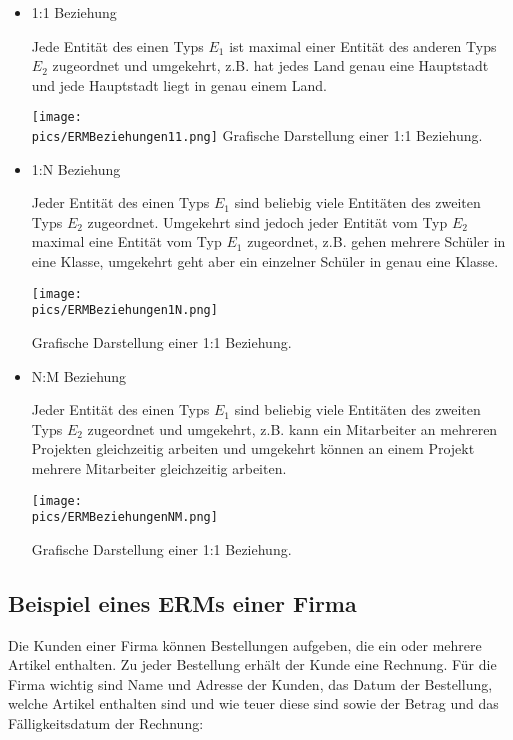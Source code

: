 \begin{itemize}
	\item 1:1 Beziehung

	Jede Entität des einen Typs \(E_1\) ist maximal einer Entität des anderen Typs \(E_2\) zugeordnet und umgekehrt, z.B. hat jedes Land genau eine Hauptstadt und jede Hauptstadt liegt in genau einem Land.
	\begin{minipage}{0.8\textwidth}
		\centering\texttt{[image: \\pics/ERMBeziehungen11.png]}
		Grafische Darstellung einer 1:1 Beziehung.
	\end{minipage}
	\item 1:N Beziehung

	Jeder Entität des einen Typs \(E_1\) sind beliebig viele Entitäten des zweiten Typs \(E_2\) zugeordnet. Umgekehrt sind jedoch jeder Entität vom Typ \(E_2\) maximal eine Entität vom Typ \(E_1\) zugeordnet, z.B. gehen mehrere Schüler in eine Klasse, umgekehrt geht aber ein einzelner Schüler in genau eine Klasse.

	\begin{minipage}{0.8\textwidth}
		\centering\texttt{[image: \\pics/ERMBeziehungen1N.png]}

		Grafische Darstellung einer 1:1 Beziehung.
	\end{minipage}
	\item N:M Beziehung

	Jeder Entität des einen Typs \(E_1\) sind beliebig viele Entitäten des zweiten Typs \(E_2\) zugeordnet und umgekehrt, z.B. kann ein Mitarbeiter an mehreren Projekten gleichzeitig arbeiten und umgekehrt können an einem Projekt mehrere Mitarbeiter gleichzeitig arbeiten.

	\begin{minipage}{0.8\textwidth}
		\centering\texttt{[image: \\pics/ERMBeziehungenNM.png]}

		Grafische Darstellung einer 1:1 Beziehung.
	\end{minipage}
\end{itemize}

\subsection{Beispiel eines ERMs einer Firma}
Die Kunden einer Firma können Bestellungen aufgeben, die ein oder mehrere Artikel enthalten. Zu jeder Bestellung erhält der Kunde eine Rechnung. Für die Firma wichtig sind Name und Adresse der Kunden, das Datum der Bestellung, welche Artikel enthalten sind und wie teuer diese sind sowie der Betrag und das Fälligkeitsdatum der Rechnung:


